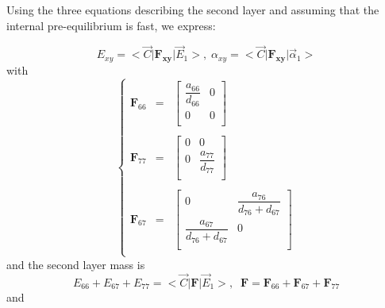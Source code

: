 \documentclass[aps,onecolumn,11pt]{revtex4}
\newcommand{\mymat}[1]{{\bm{#1}}}
\begin{document}
\begin{itemize}
\end{itemize}

Using the three equations describing the second layer and assuming that the internal pre-equilibrium is fast, we express:

\begin{equation}
\boxed{
E_{xy} = <{\vec{C}} \vert \mymat{F_{xy}} \vert \vec{E}_1 >,\;\alpha_{xy} = <{\vec{C}} \vert \mymat{F_{xy}} \vert \vec{\alpha}_1 >
}
\end{equation}
with
\begin{equation}
\left\lbrace
\begin{array}{rcl}
\mymat{F}_{66} & = & 
\begin{bmatrix}
	\dfrac{a_{66}}{d_{66}} & 0 \\
	0 & 0\\
\end{bmatrix} \\
\\
\mymat{F}_{77} & = & 
\begin{bmatrix}
	0 & 0 \\
	0 & \dfrac{a_{77}}{d_{77}}\\
\end{bmatrix}  \\
\\
\mymat{F}_{67} & = & 
\begin{bmatrix}
	0 &\dfrac{a_{76}}{d_{76}+d_{67}}\\
	\dfrac{a_{67}}{d_{76}+d_{67}} & 0\\
\end{bmatrix} \\
\end{array}
\right.
\end{equation}
and the second layer mass is
\begin{equation}
E_{66} + E_{67} + E_{77} = <{\vec{C}} \vert \mymat{F} \vert \vec{E}_1 >, \;\;
 \mymat{F} 
 =  \mymat{F}_{66} + \mymat{F}_{67}  + \mymat{F}_{77} 
\end{equation}
and
\end{document}
